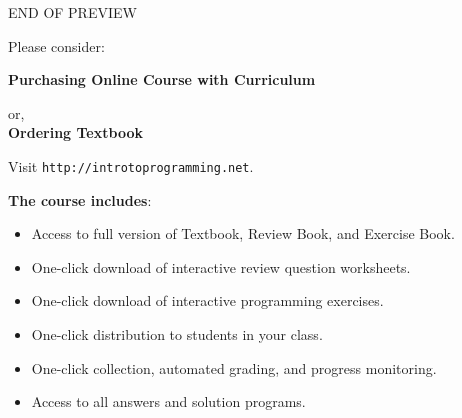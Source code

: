 \documentclass[article,A4,12pt]{llncs}
\newif\iffullversion
\begin{document}
\newpage
\iffullversion
\else
\vbox{}
\vfill
\pagestyle{empty}
    \begin{center}
    {\huge \color{red}END OF PREVIEW}\\[2cm]

\centerline{\Large Please consider:}
\vspace{1cm}

{\Large \bf Purchasing Online Course with Curriculum}
\vspace{1cm}

    {\Large or,}\\[1cm]

{\Large \bf Ordering Textbook}
\vspace{1cm}

    {\Large Visit {\tt http://introtoprogramming.net}. \\[2cm]
}
\end{center}
{\bf The course includes}:
\begin{itemize}
\item Access to full version of Textbook, Review Book, and Exercise Book.
\item One-click download of interactive review question worksheets.
\item One-click download of interactive programming exercises.
\item One-click distribution to students in your class.
\item One-click collection, automated grading, and progress monitoring.
\item Access to all answers and solution programs.
\end{itemize}

\vfill
    
\end{document}
